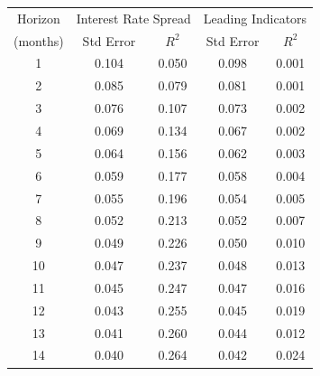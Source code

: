 \documentclass[letterpaper,12pt]{article}
\begin{document}
%
\begin{table}
\begin{center}
\setlength{\tabcolsep}{0.20in}
\begin{tabular}{ccccc}
\hline\hline
Horizon &  \multicolumn{2}{c}{Interest Rate Spread} & \multicolumn{2}{c}{Leading Indicators}\\
\cline{2-3} \cline{4-5}
(months)    &          Std Error                  &   $ R^2 $ &          Std Error        &   $ R^2 $\\
\hline\hline
         1        &          0.104               &    0.050  &          0.098                     &   0.001  \\
         2        &          0.085               &    0.079  &          0.081                     &   0.001 \\
         3        &          0.076               &    0.107  &           0.073                   &    0.002\\
         4         &          0.069               &    0.134  &           0.067                   &  0.002\\
         5        &          0.064               &    0.156  &           0.062                   &  0.003\\
         6        &          0.059               &    0.177  &          0.058                    &  0.004 \\
         7         &          0.055               &    0.196  &           0.054                   &  0.005\\
         8        &          0.052               &    0.213  &           0.052                   &   0.007\\
         9        &          0.049               &    0.226  &           0.050                   & 0.010\\
         10         &         0.047               &    0.237  &            0.048                  & 0.013\\
         11        &         0.045               &    0.247  &            0.047                  & 0.016\\
         12        &         0.043               &    0.255  &            0.045                  & 0.019\\
         13         &         0.041               &    0.260  &            0.044                  & 0.012\\
         14        &         0.040               &    0.264  &            0.042                  & 0.024\\

\end{tabular}
\end{center}
\end{table}
\end{document}
